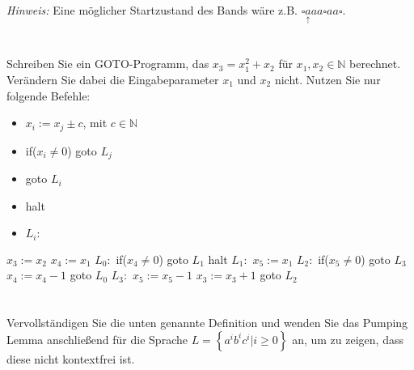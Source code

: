 \documentclass{article}
\begin{document}
\emph{Hinweis:} Eine möglicher Startzustand des Bands wäre z.B. $\square \underset{\uparrow}{a}aa\square aa\square$.

\begin{solution}[6.5]
\end{solution}

\section{}
Schreiben Sie ein GOTO-Programm, das $x_3 = x_1^2 + x_2$ für $x_1, x_2 \in \mathbb{N}$ berechnet. Verändern Sie dabei die Eingabeparameter $x_1$ und $x_2$ nicht. 
Nutzen Sie nur folgende Befehle:
\begin{itemize}
	\item $x_i := x_j \pm c$, mit $c \in \mathbb{N}$
	\item if($x_i\neq0$) goto $L_j$
	\item goto $L_i$
	\item halt
  \item $L_i:$
\end{itemize}

\begin{solutioncode}[6]
    $x_3 := x_2$
    $x_4 := x_1$
$L_0:$ if($x_4 \neq 0$) goto $L_1$
    halt
$L_1:$ $x_5 := x_1$
$L_2:$ if($x_5 \neq 0$) goto $L_3$
    $x_4 := x_4 - 1$
    goto $L_0$
$L_3:$ $x_5 := x_5 - 1$
    $x_3 := x_3 + 1$
    goto $L_2$
\end{solutioncode}

\newpage
\section{}
Vervollständigen Sie die unten genannte Definition und wenden Sie das Pumping Lemma anschließend für die Sprache $L=\left\{a^ib^ic^i|i\geq 0\right\}$ an, um zu zeigen, dass diese nicht kontextfrei ist.
\end{document}
